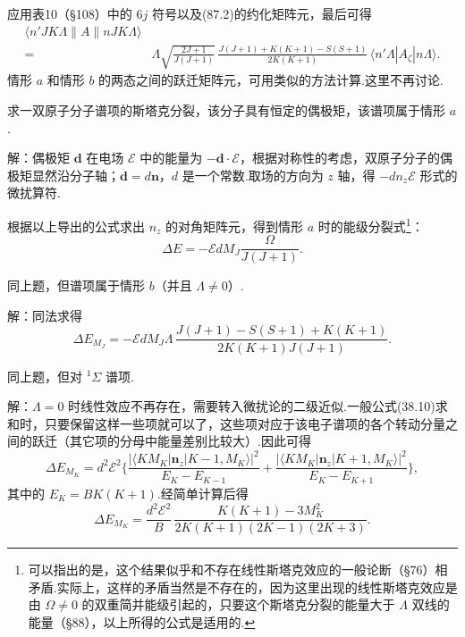 应用表10（§108）中的 $6j$ 符号以及(87.2)的约化矩阵元，最后可得
\begin{equation*}
\begin{aligned}
  \langle n'JK\Lambda\parallel A\parallel nJK\Lambda\rangle&\\
  ={}&\Lambda\sqrt{\frac{2J+1}{J(J+1)}}\,
  \frac{J(J+1)+K(K+1)-S(S+1)}{2K(K+1)}\,
  \langle n'\Lambda|A_\zeta|n\Lambda\rangle.
\end{aligned}
\end{equation*}
情形 $a$ 和情形 $b$ 的两态之间的跃迁矩阵元，可用类似的方法计算.这里不再讨论.

\begin{xiti}

\quad 求一双原子分子谱项的斯塔克分裂，该分子具有恒定的偶极矩，该谱项属于情形 $a$.

解：偶极矩 $\boldsymbol{d}$ 在电场 $\mathcal{E}$ 中的能量为 $-\boldsymbol{d}\cdot\boldsymbol{\mathcal{E}}$，根据对称性的考虑，双原子分子的偶极矩显然沿分子轴；$\boldsymbol{d}=d\boldsymbol{n}$，$d$ 是一个常数.取场的方向为 $z$ 轴，得 $-dn_z\mathcal{E}$ 形式的微扰算符.

根据以上导出的公式求出 $n_z$ 的对角矩阵元，得到情形 $a$ 时的能级分裂式\footnote{可以指出的是，这个结果似乎和不存在线性斯塔克效应的一般论断（§76）相矛盾.实际上，这样的矛盾当然是不存在的，因为这里出现的线性斯塔克效应是由 $\Omega\neq0$ 的双重简并能级引起的，只要这个斯塔克分裂的能量大于 $\Lambda$ 双线的能量（§88），以上所得的公式是适用的.}：
\begin{equation*}
  \Delta E=-\mathcal{E}dM_J\frac{\Omega}{J(J+1)}.
\end{equation*}

\quad 同上题，但谱项属于情形 $b$（并且 $\Lambda\neq0$）.

解：同法求得
\begin{equation*}
  \Delta E_{M_J}=-\mathcal{E}dM_J\Lambda\,
  \frac{J(J+1)-S(S+1)+K(K+1)}{2K(K+1)J(J+1)}.
\end{equation*}

\quad 同上题，但对 $^1\Sigma$ 谱项.

解：$\Lambda=0$ 时线性效应不再存在，需要转入微扰论的二级近似.一般公式(38.10)求和时，只要保留这样一些项就可以了，这些项对应于该电子谱项的各个转动分量之间的跃迁（其它项的分母中能量差别比较大）.因此可得
\begin{equation*}
  \Delta E_{M_K}=d^2\mathcal{E}^2\bigg\{
  \frac{\left|\langle KM_K|\boldsymbol{n}_z|K-1,M_K\rangle\right|^2}{E_K-E_{K-1}}
  +\frac{\left|\langle KM_K|\boldsymbol{n}_z|K+1,M_K\rangle\right|^2}{E_K-E_{K+1}}\bigg\},
\end{equation*}
其中的 $E_K=BK(K+1)$.经简单计算后得
\begin{equation*}
  \Delta E_{M_K}=\frac{d^2\mathcal{E}^2}{B}\,
  \frac{K(K+1)-3M_K^2}{2K(K+1)(2K-1)(2K+3)}.
\end{equation*}

\end{xiti}

